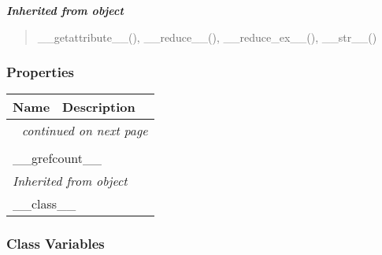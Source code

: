 \large{\textbf{\textit{Inherited from object}}}

\begin{quote}
\_\_getattribute\_\_(), \_\_reduce\_\_(), \_\_reduce\_ex\_\_(), \_\_str\_\_()
\end{quote}


  \subsubsection{Properties}

    \vspace{-1cm}
\hspace{\varindent}\begin{longtable}{|p{\varnamewidth}|p{\vardescrwidth}|l}
\cline{1-2}
\cline{1-2} \centering \textbf{Name} & \centering \textbf{Description}& \\
\cline{1-2}
\endhead\cline{1-2}\multicolumn{3}{r}{\small\textit{continued on next page}}\\\endfoot\cline{1-2}
\endlastfoot\multicolumn{2}{|l|}{\textit{Inherited from ??.GObject}}\\
\multicolumn{2}{|p{\varwidth}|}{\raggedright \_\_grefcount\_\_}\\
\cline{1-2}
\multicolumn{2}{|l|}{\textit{Inherited from object}}\\
\multicolumn{2}{|p{\varwidth}|}{\raggedright \_\_class\_\_}\\
\cline{1-2}
\end{longtable}



  \subsubsection{Class Variables}

